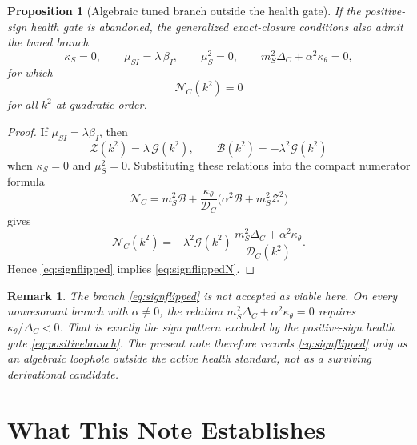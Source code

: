 \documentclass[11pt]{article}
\newtheorem{proposition}{Proposition}
\newtheorem{remark}{Remark}
\begin{document}
\begin{proposition}[Algebraic tuned branch outside the health gate]
If the positive-sign health gate is abandoned, the generalized exact-closure conditions also admit the tuned branch
\begin{equation}
\kappa_S=0,
\qquad
\mu_{SI}=\lambda\,\beta_I,
\qquad
\mu_S^2=0,
\qquad
m_S^2\Delta_C+\alpha^2\kappa_\theta=0,
\label{eq:signflipped}
\end{equation}
for which
\begin{equation}
\mathcal N_C(k^2)=0
\label{eq:signflippedN}
\end{equation}
for all \(k^2\) at quadratic order.
\end{proposition}

\begin{proof}
If \(\mu_{SI}=\lambda\beta_I\), then
\[
\mathcal Z(k^2)=\lambda\,\mathcal G(k^2),
\qquad
\mathcal B(k^2)=-\lambda^2\mathcal G(k^2)
\]
when \(\kappa_S=0\) and \(\mu_S^2=0\). Substituting these relations into the compact numerator formula
\[
\mathcal N_C
=
m_S^2\mathcal B
+\frac{\kappa_\theta}{\mathcal D_C}
\bigl(\alpha^2\mathcal B+m_S^2\mathcal Z^2\bigr)
\]
gives
\[
\mathcal N_C(k^2)
=
-\lambda^2\mathcal G(k^2)\,
\frac{m_S^2\Delta_C+\alpha^2\kappa_\theta}
{\mathcal D_C(k^2)}.
\]
Hence \eqref{eq:signflipped} implies \eqref{eq:signflippedN}.
\end{proof}

\begin{remark}
The branch \eqref{eq:signflipped} is not accepted as viable here. On every nonresonant branch with \(\alpha\neq 0\), the relation \(m_S^2\Delta_C+\alpha^2\kappa_\theta=0\) requires \(\kappa_\theta/\Delta_C<0\). That is exactly the sign pattern excluded by the positive-sign health gate \eqref{eq:positivebranch}. The present note therefore records \eqref{eq:signflipped} only as an algebraic loophole outside the active health standard, not as a surviving derivational candidate.
\end{remark}

\section{What This Note Establishes}
\end{document}
